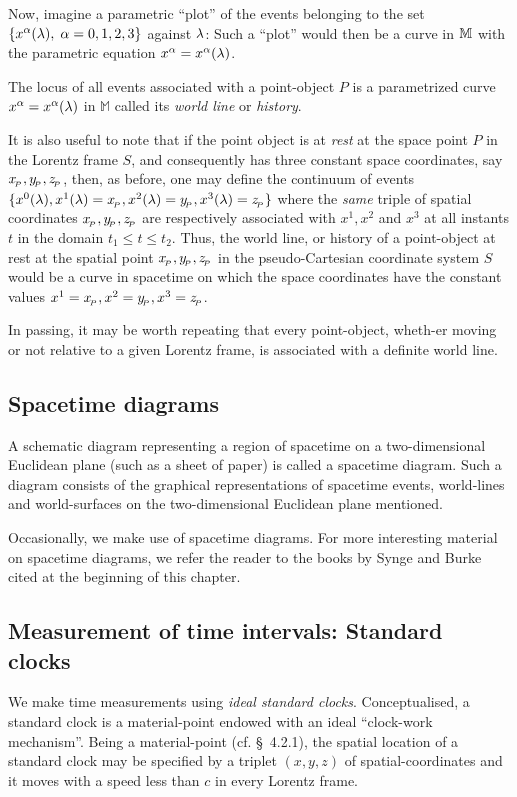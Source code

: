 \begin{small}
Now, imagine a parametric ``plot'' of the events belonging 
to the set $\{x^{{\alpha}}({\lambda}),\;{\alpha}=0,1,2,3 \}$ against 
${\lambda}$: Such a ``plot''  would then be a curve in $\mathbb{M}$ 
with the parametric equation $x^{{\alpha}}=x^{{\alpha}}({\lambda})$.

\dfn The locus  of all events associated with a 
point-object 
$P$ is a parametrized curve $x^{{\alpha}} =x^{{\alpha}}({\lambda})$ 
in $\mathbb{M}$ called its \textsl{world line} or 
\textsl{history}.  

 It is also useful to note 
that if the point object is at \textsl{rest} at the space 
point $P$ in the Lorentz frame $S$, and consequently has 
three constant space coordinates, say 
$x_{_{\hspace*{-1.5pt}{P}}},y_{_{\hspace*{-1.5pt}{P}}},z_{_{\hspace*{-1.5pt}{P}}}$, then,  as before, one may 
define the continuum of events $\{x^0({\lambda}), 
x^1({\lambda})=x_{_{\hspace*{-1.5pt}{P}}}, x^2({\lambda})=y_{_{\hspace*{-1.5pt}{P}}}, 
x^3({\lambda})=z_{_{\hspace*{-1.5pt}{P}}}\}$  where the \textsl{same} triple of 
spatial coordinates $x_{_{\hspace*{-1.5pt}{P}}}, y_{_{\hspace*{-1.5pt}{P}}},z_{_{\hspace*{-1.5pt}{P}}}$ are 
respectively associated with $x^1, x^2$ and $x^3$ at all 
instants $t$ in the domain $t_1 \leq t\leq t_2$. Thus, the  
world line, or history of a point-object at rest at the 
spatial point $x_{_{\hspace*{-1.5pt}{P}}},y_{_{\hspace*{-1.5pt}{P}}},z_{_{\hspace*{-1.5pt}{P}}}$ in the 
pseudo-Cartesian coordinate system $S$ would be a curve in 
spacetime on which the space coordinates have the constant 
values $x^1=x_{_{\hspace*{-1.5pt}{P}}}, x^2=y_{_{\hspace*{-1.5pt}{P}}}, x^3=z_{_{\hspace*{-1.5pt}{P}}}$.

In passing, it may be worth repeating that every 
point-object, wheth-\break er moving or not relative to a given 
Lorentz frame, is associated with a definite world line.

\subsection{Spacetime diagrams}

A schematic diagram representing a region of spacetime on a 
two-dimen\break sional Euclidean plane (such as a sheet of paper) 
is called a spacetime diagram. Such a diagram consists of 
the graphical representations of spacetime events, 
world-lines and world-surfaces on the two-dimension\break al 
Euclidean plane mentioned.

Occasionally, we make use of spacetime diagrams.  For more 
interesting material on spacetime diagrams, we refer the 
reader to the books by Synge and Burke cited at the 
beginning of this chapter.

\subsection{Measurement of time intervals: 
Standard\\ clocks}  
We make time measurements using \textsl{ideal standard  
clocks}. Conceptualised, a standard clock is a 
material-point endowed with an ideal ``clock-work 
mechanism''. Being a material-point (cf. \S~4.2.1), the 
spatial location of a standard clock may be specified by a 
triplet $(x,y,z)$ of spatial-coordinates and it moves with 
a 
speed less than $c$ in every Lorentz frame.


\end{small}
